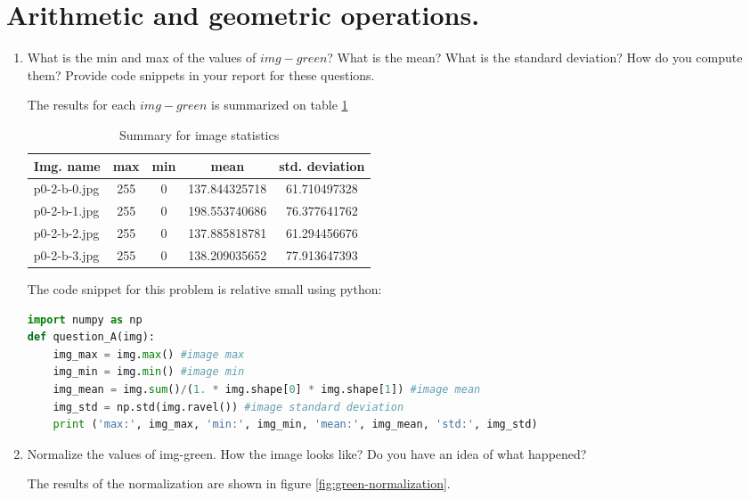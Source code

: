 \section{Arithmetic and geometric operations.}
\begin{enumerate}[label=\emph{\alph*)}]
\item What is the min and max of the values of $img-green$? What is the mean? What is the standard deviation? How do you compute them? Provide code snippets in your report for these questions.

The results for each $img-green$ is summarized on table \ref{table:statistics}

\begin{table} [!htb]
\setlength{\tabcolsep}{2.7mm}
\centering
\begin{tabular}{lcccc}
\toprule
\textbf{Img. name}  & \textbf{max} & \textbf{min} & \textbf{mean} & \textbf{std. deviation}\\
\midrule
p0-2-b-0.jpg & 255 & 0 & 137.844325718 & 61.710497328 \\
p0-2-b-1.jpg & 255 & 0 & 198.553740686 & 76.377641762  \\
p0-2-b-2.jpg & 255 & 0 & 137.885818781 & 61.294456676 \\
p0-2-b-3.jpg & 255 & 0 & 138.209035652 & 77.913647393 \\
\bottomrule
\end{tabular}
\caption{Summary for image statistics}
\label{table:statistics}
\end{table}

The code snippet for this problem is relative small using python:

\begin{lstlisting}[language=python]
import numpy as np
def question_A(img):
	img_max = img.max() #image max
	img_min = img.min() #image min
	img_mean = img.sum()/(1. * img.shape[0] * img.shape[1]) #image mean
	img_std = np.std(img.ravel()) #image standard deviation
	print ('max:', img_max, 'min:', img_min, 'mean:', img_mean, 'std:', img_std)
\end{lstlisting}

\item Normalize the values of img-green. How the image looks like? Do you have an idea of what happened?

The results of the normalization are shown in figure \ref{fig:green-normalization}.


\end{enumerate}
